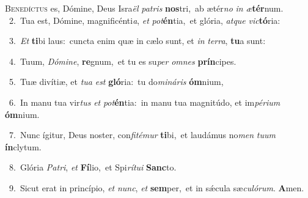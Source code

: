 \lettrine{\initial\textcolor{\initialcolor}{B}}{enedíctus} es, Dómine, Deus Isra\textit{ël} \textit{pa}\-\textit{tris} \textbf{nos}\-tri,~\star ab ætér\textit{no} \textit{in} \textit{æ}\-\textbf{tér}num.\\
{\numbfont\textcolor{\numbcolor}{~2.}}~Tua est, Dómine, magnificénti\-\textit{a}\-, \textit{et} \textit{pot}\-\textbf{én}tia,~\star et glória, \textit{at}\-\textit{que} \textit{vic}\-\textbf{tó}ria:\par
{\numbfont\textcolor{\numbcolor}{~3.}}~\textit{Et} \textbf{ti}\-bi laus:~\star cuncta enim quæ in cælo sunt, et \textit{in} \textit{ter}\-\textit{ra}, \textbf{tu}\-a sunt:\par
{\numbfont\textcolor{\numbcolor}{~4.}}~Tuum, \textit{Dó}\-\textit{mi}\textit{ne}, \textbf{re}\-gnum,~\star et tu es su\textit{per} \textit{om}\-\textit{nes} \textbf{prín}\-cipes.\par
{\numbfont\textcolor{\numbcolor}{~5.}}~Tuæ divítiæ, et \textit{tu}\-\textit{a} \textit{est} \textbf{gló}\-ria:~\star tu do\-\textit{mi}\-\textit{ná}\textit{ris} \textbf{óm}\-nium,\par
{\numbfont\textcolor{\numbcolor}{~6.}}~In manu tua vir\textit{tus} \textit{et} \textit{pot}\-\textbf{én}tia:~\star in manu tua magnitúdo, et im\-\textit{pé}\-\textit{ri}\textit{um} \textbf{óm}\-nium.\par
{\numbfont\textcolor{\numbcolor}{~7.}}~Nunc ígitur, Deus noster, con\-\textit{fi}\-\textit{té}\textit{mur} \textbf{ti}\-bi,~\star et laudámus no\textit{men} \textit{tu}\-\textit{um} \textbf{ín}\-clytum.\par
{\numbfont\textcolor{\numbcolor}{~8.}}~Glória \textit{Pa}\-\textit{tri}, \textit{et} \textbf{Fí}\-lio,~\star et Spi\-\textit{rí}\-\textit{tu}\textit{i} \textbf{Sanc}\-to.\par
{\numbfont\textcolor{\numbcolor}{~9.}}~Sicut erat in princípio, \textit{et} \textit{nunc}\-, \textit{et} \textbf{sem}\-per,~\star et in sǽcula sæ\-\textit{cu}\-\textit{ló}\textit{rum}. \textbf{A}\-men.\par
